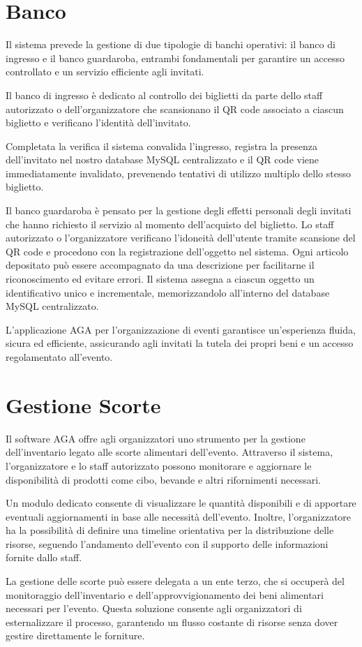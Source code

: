\documentclass[a4paper]{article}
\begin{document}
\section{Banco}
\textcolor{textcolor}{
Il sistema prevede la gestione di due tipologie di banchi operativi: il banco di ingresso e il banco guardaroba, entrambi fondamentali per garantire un accesso controllato e un servizio efficiente agli invitati.

Il banco di ingresso è dedicato al controllo dei biglietti da parte dello staff autorizzato o dell’organizzatore che scansionano il QR code associato a ciascun biglietto e verificano l’identità dell’invitato.

Completata la verifica il sistema convalida l’ingresso, registra la presenza dell’invitato nel nostro database MySQL centralizzato e il QR code viene immediatamente invalidato, prevenendo tentativi di utilizzo multiplo dello stesso biglietto.

Il banco guardaroba è pensato per la gestione degli effetti personali degli invitati che hanno richiesto il servizio al momento dell’acquisto del biglietto. Lo staff autorizzato o l’organizzatore verificano l’idoneità dell’utente tramite scansione del QR code e procedono con la registrazione dell’oggetto nel sistema. Ogni articolo depositato può essere accompagnato da una descrizione per facilitarne il riconoscimento ed evitare errori. Il sistema assegna a ciascun oggetto un identificativo unico e incrementale, memorizzandolo all’interno del database MySQL centralizzato.

L’applicazione AGA per l’organizzazione di eventi garantisce un’esperienza fluida, sicura ed efficiente, assicurando agli invitati la tutela dei propri beni e un accesso regolamentato all’evento.
}

\section{Gestione Scorte}
\textcolor{textcolor}{
Il software AGA offre agli organizzatori uno strumento per la gestione dell'inventario legato alle scorte alimentari dell'evento. Attraverso il sistema, l’organizzatore e lo staff autorizzato possono monitorare e aggiornare le disponibilità di prodotti come cibo, bevande e altri rifornimenti necessari.

Un modulo dedicato consente di visualizzare le quantità disponibili e di apportare eventuali aggiornamenti in base alle necessità dell’evento. Inoltre, l’organizzatore ha la possibilità di definire una timeline orientativa per la distribuzione delle risorse, seguendo l’andamento dell’evento con il supporto delle informazioni fornite dallo staff.

La gestione delle scorte può essere delegata a un ente terzo, che si occuperà del monitoraggio dell'inventario e dell'approvvigionamento dei beni alimentari necessari per l'evento. Questa soluzione consente agli organizzatori di esternalizzare il processo, garantendo un flusso costante di risorse senza dover gestire direttamente le forniture.
}
\end{document}
